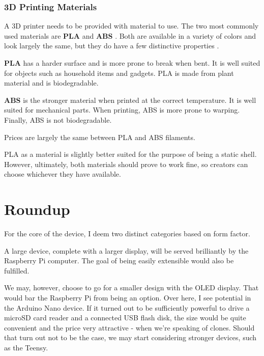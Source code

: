             \subsubsection{3D Printing Materials}
                A 3D printer needs to be provided with material to use.  The two most commonly used materials are \textbf{PLA} and \textbf{ABS} \cite{all3dp-best-fileament-types}.  Both are available in a variety of colors and look largely the same, but they do have a few distinctive properties \cite{all3dp-pla-abs}. 
                
                \textbf{PLA} has a harder surface and is more prone to break when bent.  It is well suited for objects such as household items and gadgets.  PLA is made from plant material and is biodegradable.
                
                \textbf{ABS} is the stronger material when printed at the correct temperature.  It is well suited for mechanical parts.  When printing, ABS is more prone to warping.  Finally, ABS is not biodegradable.
                
                Prices are largely the same between PLA and ABS filaments.
                
                PLA as a material is slightly better suited for the purpose of being a static shell.  However, ultimately, both materials should prove to work fine, so creators can choose whichever they have available.
                
    \section{Roundup}
        For the core of the device, I deem two distinct categories based on form factor.
        
        A large device, complete with a larger display, will be served brilliantly by the Raspberry Pi computer.  The goal of being easily extensible would also be fulfilled.
        
        We may, however, choose to go for a smaller design with the OLED display.  That would bar the Raspberry Pi from being an option.  Over here, I see potential in the Arduino Nano device.  If it turned out to be sufficiently powerful to drive a microSD card reader and a connected USB flash disk, the size would be quite convenient and the price very attractive - when we're speaking of clones.  Should that turn out not to be the case, we may start considering stronger devices, such as the Teensy.
        

